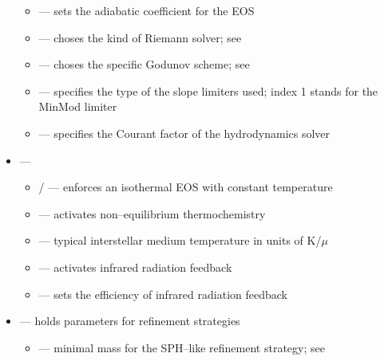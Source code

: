 \begin{itemize}
  \begin{itemize}
    \item {} --- sets the adiabatic coefficient for the EOS\\[-9pt]
    \item {} --- choses the kind of Riemann solver; see \\[-9pt]
    \item {} --- choses the specific Godunov scheme; see \\[-9pt]
    \item {} --- specifies the type of the slope limiters used; index 1 stands for the MinMod limiter\\[-9pt]
    \item {} --- specifies the Courant factor of the hydrodynamics solver\\[-3pt]
  \end{itemize}
  \item {} \quad --- \\[-9pt]
  \begin{itemize}
    \item {}/ --- enforces an isothermal EOS with constant temperature\\[-9pt]
    \item {} --- activates non--equilibrium thermochemistry\\[-9pt]
    \item {} --- typical interstellar medium temperature in units of K/$\mu$\\[-9pt]
    \item {} --- activates infrared radiation feedback\\[-9pt]
    \item {} --- sets the efficiency of infrared radiation feedback\\[-3pt]
  \end{itemize}
  \item {} \quad --- holds parameters for refinement strategies\\[-9pt]
  \begin{itemize}
    \item {} --- minimal mass for the SPH--like refinement strategy; see \\[-9pt]

\end{itemize}
\end{itemize}
